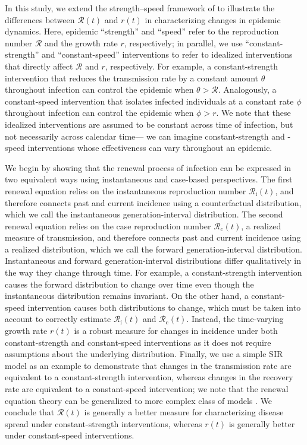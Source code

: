 \documentclass[12pt]{article}
\newcommand{\Rx}[1]{\ensuremath{{\mathcal R}_{#1}}\xspace}
\newcommand{\Rc}{\Rx{\mathrm{c}}}
\newcommand{\Ri}{\Rx{\mathrm{i}}}
\newcommand{\RR}{\ensuremath{{\mathcal R}}\xspace}
\begin{document}
In this study, we extend the strength--speed framework of \cite{dushoff2021speed} to illustrate the differences between $\RR(t)$ and $r(t)$ in characterizing changes in epidemic dynamics.
Here, epidemic ``strength'' and ``speed'' refer to the reproduction number $\RR$ and the growth rate $r$, respectively; 
in parallel, we use ``constant-strength'' and ``constant-speed'' interventions to refer to idealized interventions that directly affect $\RR$ and $r$, respectively. 
For example, a constant-strength intervention that reduces the transmission rate by a constant amount $\theta$ throughout infection can control the epidemic when $\theta > \RR$. 
Analogously, a constant-speed intervention that isolates infected individuals at a constant rate $\phi$ throughout infection can control the epidemic when $\phi > r$.
We note that these idealized interventions are assumed to be constant across time of infection, but not necessarily across calendar time--- we can imagine constant-strength and -speed interventions whose effectiveness can vary throughout an epidemic.

We begin by showing that the renewal process of infection can be expressed in two equivalent ways using instantaneous and case-based perspectives.
The first renewal equation relies on the instantaneous reproduction number $\Ri(t)$, and therefore connects past and current incidence using a counterfactual distribution, which we call the instantaneous generation-interval distribution.
The second renewal equation relies on the case reproduction number $\Rc(t)$, a realized measure of transmission, and therefore connects past and current incidence using a realized distribution, which we call the forward generation-interval distribution.
Instantaneous and forward generation-interval distributions differ qualitatively in the way they change through time.
For example, a constant-strength intervention causes the forward distribution to change over time even though the instantaneous distribution remains invariant.
On the other hand, a constant-speed intervention causes both distributions to change, which must be taken into account to correctly estimate $\Ri(t)$ and $\Rc(t)$.
Instead, the time-varying growth rate $r(t)$ is a robust measure for changes in incidence under both constant-strength and constant-speed interventions as it does not require assumptions about the underlying distribution.
Finally, we use a simple SIR model as an example to demonstrate that changes in the transmission rate are equivalent to a constant-strength intervention, whereas changes in the recovery rate are equivalent to a constant-speed intervention;
we note that the renewal equation theory can be generalized to more complex class of models \citep{champredon2018equivalence}.
We conclude that $\RR(t)$ is generally a better measure for characterizing disease spread under constant-strength interventions, whereas $r(t)$ is generally better under constant-speed interventions.
\end{document}
